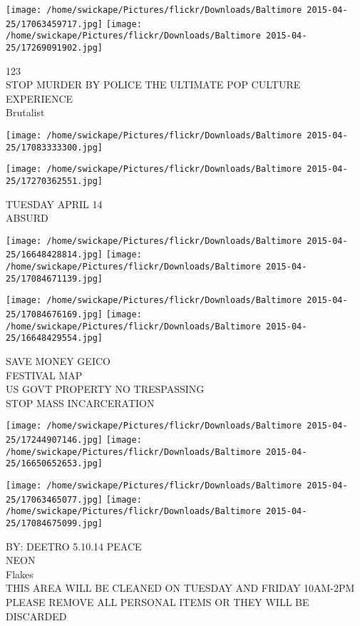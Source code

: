 \documentclass[10pt,letterpaper]{article}
\begin{document}
\vspace{0.25in}
\texttt{[image: /home/swickape/Pictures/flickr/Downloads/Baltimore 2015-04-25/17063459717.jpg]}
\texttt{[image: /home/swickape/Pictures/flickr/Downloads/Baltimore 2015-04-25/17269091902.jpg]}

123\\
STOP MURDER BY POLICE THE ULTIMATE POP CULTURE EXPERIENCE\\
Brutalist\\
\pagebreak

\texttt{[image: /home/swickape/Pictures/flickr/Downloads/Baltimore 2015-04-25/17083333300.jpg]}

\vspace{0.25in}
\texttt{[image: /home/swickape/Pictures/flickr/Downloads/Baltimore 2015-04-25/17270362551.jpg]}

TUESDAY APRIL 14\\
ABSURD\\
\pagebreak

\texttt{[image: /home/swickape/Pictures/flickr/Downloads/Baltimore 2015-04-25/16648428814.jpg]}
\texttt{[image: /home/swickape/Pictures/flickr/Downloads/Baltimore 2015-04-25/17084671139.jpg]}

\texttt{[image: /home/swickape/Pictures/flickr/Downloads/Baltimore 2015-04-25/17084676169.jpg]}
\texttt{[image: /home/swickape/Pictures/flickr/Downloads/Baltimore 2015-04-25/16648429554.jpg]}

SAVE MONEY GEICO\\
FESTIVAL MAP\\
US GOVT PROPERTY NO TRESPASSING\\
STOP MASS INCARCERATION\\
\pagebreak

\texttt{[image: /home/swickape/Pictures/flickr/Downloads/Baltimore 2015-04-25/17244907146.jpg]}
\texttt{[image: /home/swickape/Pictures/flickr/Downloads/Baltimore 2015-04-25/16650652653.jpg]}

\texttt{[image: /home/swickape/Pictures/flickr/Downloads/Baltimore 2015-04-25/17063465077.jpg]}
\texttt{[image: /home/swickape/Pictures/flickr/Downloads/Baltimore 2015-04-25/17084675099.jpg]}

BY: DEETRO 5.10.14 PEACE\\
NEON\\
Flakes\\
THIS AREA WILL BE CLEANED ON TUESDAY AND FRIDAY 10AM{-}2PM PLEASE REMOVE ALL PERSONAL ITEMS OR THEY WILL BE DISCARDED\\
\pagebreak
\end{document}
